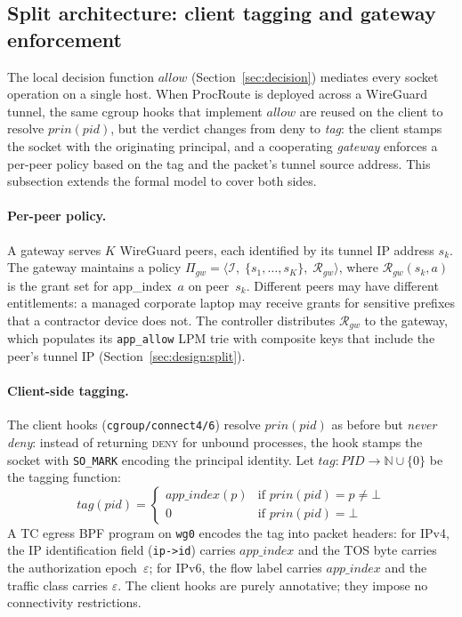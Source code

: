 \documentclass[sigconf]{acmart}
\begin{document}
\subsection{Split architecture: client tagging and gateway enforcement}
\label{sec:model:split}

The local decision function $\mathit{allow}$
(Section~\ref{sec:decision}) mediates every socket operation on a
single host.
When ProcRoute is deployed across a WireGuard tunnel, the same
cgroup hooks that implement $\mathit{allow}$ are reused on the
client to resolve $\mathit{prin}(\mathit{pid})$, but the verdict
changes from deny to \emph{tag}: the client stamps the socket
with the originating principal, and a cooperating \emph{gateway}
enforces a per-peer policy based on the tag and the packet's
tunnel source address.
This subsection extends the formal model to cover both sides.

\paragraph{Per-peer policy.}
A gateway serves $K$ WireGuard peers, each identified by its
tunnel IP address $s_k$.
The gateway maintains a policy
$\Pi_{\mathit{gw}} =
  \langle \mathcal{I},\;
         \{s_1,\ldots,s_K\},\;
         \mathcal{R}_{\mathit{gw}} \rangle$,
where $\mathcal{R}_{\mathit{gw}}(s_k, a)$ is the grant set
for app\_index~$a$ on peer~$s_k$.
Different peers may have different entitlements: a managed
corporate laptop may receive grants for sensitive prefixes that
a contractor device does not.
The controller distributes $\mathcal{R}_{\mathit{gw}}$ to the
gateway, which populates its \texttt{app\_allow} LPM trie with
composite keys that include the peer's tunnel IP
(Section~\ref{sec:design:split}).

\paragraph{Client-side tagging.}
The client hooks (\texttt{cgroup/connect4/6}) resolve
$\mathit{prin}(\mathit{pid})$ as before but \emph{never
deny}: instead of returning \textsc{deny} for unbound
processes, the hook stamps the socket with
\texttt{SO\_MARK} encoding the principal identity.
Let $\mathit{tag}: \mathit{PID} \to \mathbb{N} \cup \{0\}$ be
the tagging function:
\[
  \mathit{tag}(\mathit{pid}) =
  \begin{cases}
    \mathit{app\_index}(p) & \text{if } \mathit{prin}(\mathit{pid}) = p \neq \bot \\
    0 & \text{if } \mathit{prin}(\mathit{pid}) = \bot
  \end{cases}
\]
A TC egress BPF program on \texttt{wg0} encodes the tag into
packet headers: for IPv4, the IP identification field
(\texttt{ip->id}) carries $\mathit{app\_index}$ and the TOS byte
carries the authorization epoch~$\varepsilon$; for IPv6, the flow
label carries $\mathit{app\_index}$ and the traffic class carries
$\varepsilon$.
The client hooks are purely annotative; they impose no
connectivity restrictions.
\end{document}
